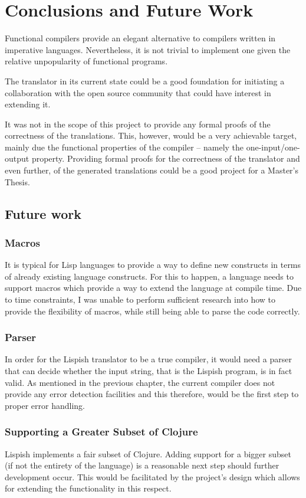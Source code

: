 \chapter{Conclusions and Future Work}

Functional compilers provide an elegant alternative to compilers written in imperative languages. Nevertheless, it is not trivial to implement one given the relative unpopularity of functional programs. 

The translator in its current state could be a good foundation for initiating a collaboration with the open source community that could have interest in extending it. 

It was not in the scope of this project to provide any formal proofs of the correctness of the translations. This, however, would be a very achievable target, mainly due the functional properties of the compiler -- namely the one-input/one-output property. 
Providing formal proofs for the correctness of the translator and even further, of the generated translations could be a good project for a Master's Thesis. 

\section{Future work}
\subsection{Macros}
It is typical for Lisp languages to provide a way to define new constructs in terms of already existing language constructs.
For this to happen, a language needs to support macros which 
provide a way to extend the language at compile time. 
Due to time constraints, I was unable to perform sufficient research into how to provide the flexibility of macros, while still being able to parse the code correctly. 

\subsection{Parser}
In order for the Lispish translator to be a true compiler, it would need a parser that can decide whether the input string, that is the Lispish program, is in fact valid. As mentioned in the previous chapter, the current compiler does not provide any error detection facilities and this therefore, would be the first step to proper error handling. 

\subsection{Supporting a Greater Subset of Clojure}
Lispish implements a fair subset of Clojure. Adding support for a bigger subset
(if not the entirety of the language) is a reasonable next step should further development occur. This would be facilitated by the project's design which allows for extending the functionality in this respect.

